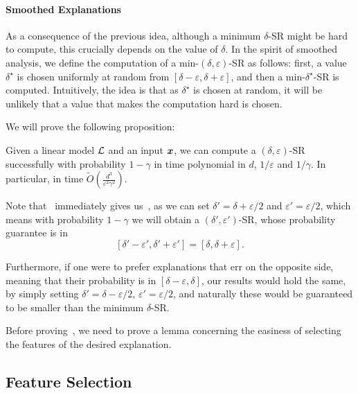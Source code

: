  \paragraph{Smoothed Explanations} As a consequence of the previous idea, although a minimum $\delta$-SR might be hard to compute, this crucially depends on the value of $\delta$. In the spirit of smoothed analysis, we define the computation of a min-$(\delta, \varepsilon)$-SR as follows: first, a value $\delta^\star$ is chosen uniformly at random from $[\delta-\varepsilon, \delta+\varepsilon]$, and then a min-$\delta^\star$-SR is computed. Intuitively, the idea is that as $\delta^\star$ is chosen at random, it will be unlikely that a value that makes the computation hard is chosen. 

 We will prove the following proposition:

\begin{proposition}
    \label{prop:smoothed-explanation}
    Given a linear model $\mathcal{L}$ and an input ${\bm{x}}$, we can compute a $(\delta, \varepsilon)$-SR successfully with probability $1 - \gamma$ in time polynomial in $d$, $1/\varepsilon$ and $1/\gamma$. In particular, in time $\tilde{O}\left( \frac{d^3}{\varepsilon^2\gamma^2}\right)$.
\end{proposition}

Note that~ immediately gives us~, as we can set $\delta' =  \delta+\varepsilon/2$ and $\varepsilon' = \varepsilon/2$, which means with probability $1 - \gamma$ we will obtain a $(\delta', \varepsilon')$-SR, whose probability guarantee is in 
\[
  [\delta' - \varepsilon', \delta' + \varepsilon'] =  [\delta, \delta + \varepsilon].
\]

Furthermore, if one were to prefer explanations that err on the opposite side, meaning that their probability is in $[\delta - \varepsilon, \delta]$, our results would hold the same, by simply setting $\delta' = \delta - \varepsilon/2$, $\varepsilon' = \varepsilon/2$, and naturally these would be guaranteed to be smaller than the minimum $\delta$-SR.

Before proving~, we need to prove a lemma concerning the easiness of selecting the features of the desired explanation.

\subsection{Feature Selection}

